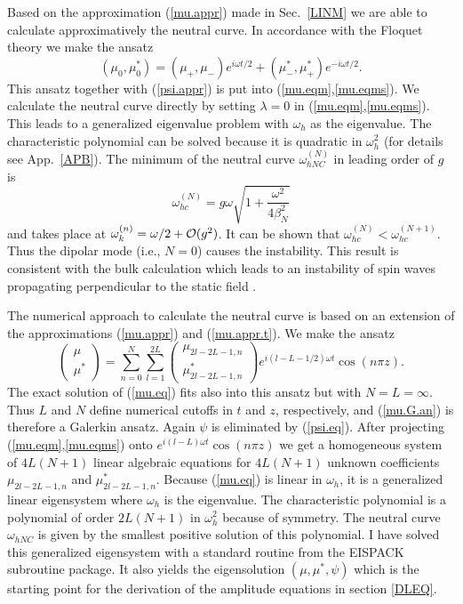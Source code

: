 Based on the approximation (\ref{mu.appr}) made in Sec.~\ref{LINM} we
are able to calculate approximatively the neutral curve. In accordance
with the Floquet theory we make the ansatz
\begin{equation}
  (\mu_0,\mu_0^*)=(\mu_+,\mu_-)e^{i\omega t/2}+
                  (\mu^*_-,\mu^*_+)e^{-i\omega t/2}.
  \label{mu.appr.t}
\end{equation}
This ansatz together with (\ref{psi.appr}) is put into
(\ref{mu.eqm},\ref{mu.eqms}). We calculate the neutral curve directly
by setting $\lambda=0$ in (\ref{mu.eqm},\ref{mu.eqms}). This leads to
a generalized eigenvalue problem with $\omega_h$ as the eigenvalue.
The characteristic polynomial can be solved because it is quadratic 
in $\omega_h^2$ (for details see App.~\ref{APB}). The minimum of
the neutral curve $\omega_{hNC}^{(N)}$ in leading order of $g$ is
\begin{equation}
  \omega_{hc}^{(N)}=g\omega\sqrt{1+\frac{\omega^2}{4\beta_N^2}}
  \label{whcn}
\end{equation}
and takes place at $\omega_k^{(n)}=\omega/2+{\cal O}(g^2)$. 
It can be shown that $\omega_{hc}^{(N)}<\omega_{hc}^{(N+1)}$.
Thus the dipolar mode (i.e., $N=0$) causes the instability. This
result is consistent with the bulk calculation which
leads to an instability of spin waves propagating
perpendicular to the static field \cite{dam.63}.

The numerical approach to calculate the neutral curve is based on an
extension of the approximations (\ref{mu.appr}) and
(\ref{mu.appr.t}). We make the ansatz
\begin{equation}
  \left(\begin{array}{c}\mu\\\mu^*\end{array}\right)=
   \sum_{n=0}^N\sum_{l=1}^{2L}\left(\begin{array}{c}\mu_{2l-2L-1,n}\\
      \mu^*_{2l-2L-1,n}\end{array}\right)e^{i(l-L-1/2)\omega t}
   \cos(n\pi z).
  \label{mu.G.an}
\end{equation}
The exact solution of (\ref{mu.eq}) fits also into this ansatz but
with $N=L=\infty$. Thus $L$ and $N$ define numerical cutoffs in $t$
and $z$, respectively, and (\ref{mu.G.an}) is therefore a Galerkin
ansatz\cite{man.90}. Again $\psi$ is eliminated by (\ref{psi.eq}). 
After projecting (\ref{mu.eqm},\ref{mu.eqms}) onto $e^{i(l-L)\omega
t}\cos (n\pi z)$ we get a homogeneous system of $4L(N+1)$ linear
algebraic equations for $4L(N+1)$ unknown coefficients
$\mu_{2l-2L-1,n}$ and $\mu^*_{2l-2L-1,n}$. Because (\ref{mu.eq}) is
linear in $\omega_h$, it is a generalized linear eigensystem where
$\omega_h$ is the eigenvalue.  The characteristic polynomial is a
polynomial of order $2L(N+1)$ in $\omega_h^2$ because of symmetry. The
neutral curve $\omega_{hNC}$ is given by the smallest positive
solution of this polynomial. I have solved this generalized eigensystem
with a standard routine from the EISPACK subroutine package. It also
yields the eigensolution $(\mu,\mu^*,\psi)$ which is the starting
point for the derivation of the amplitude equations in section
\ref{DLEQ}.

